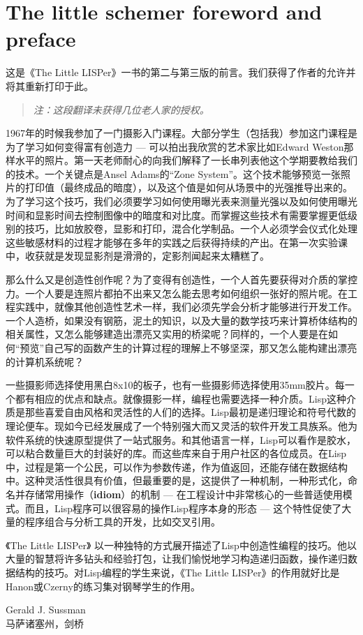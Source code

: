 \section*{The little schemer\cite{friedman96little} foreword and preface}

这是《The Little LISPer》一书的第二与第三版的前言。我们获得了作者的允许并将其重新打印于此。

\begin{quote}
\itshape
注：这段翻译未获得几位老人家的授权。
\end{quote}

1967年的时候我参加了一门摄影入门课程。大部分学生（包括我）参加这门课程是为了学习如何变得富有创造力 --- 可以拍出我欣赏的艺术家比如Edward Weston那样水平的照片。第一天老师耐心的向我们解释了一长串列表他这个学期要教给我们的技术。一个关键点是Ansel Adams的``Zone System''。这个技术能够预览一张照片的打印值（最终成品的暗度），以及这个值是如何从场景中的光强推导出来的。为了学习这个技巧，我们必须要学习如何使用曝光表来测量光强以及如何使用曝光时间和显影时间去控制图像中的暗度和对比度。而掌握这些技术有需要掌握更低级别的技巧，比如放胶卷，显影和打印，混合化学制品。一个人必须学会仪式化处理这些敏感材料的过程才能够在多年的实践之后获得持续的产出。在第一次实验课中，收获就是发现显影剂是滑滑的，定影剂闻起来太糟糕了。

那么什么又是创造性创作呢？为了变得有创造性，一个人首先要获得对介质的掌控力。一个人要是连照片都拍不出来又怎么能去思考如何组织一张好的照片呢。在工程实践中，就像其他创造性艺术一样，我们必须先学会分析才能够进行开发工作。一个人造桥，如果没有钢筋，泥土的知识，以及大量的数学技巧来计算桥体结构的相关属性，又怎么能够建造出漂亮又实用的桥梁呢？同样的，一个人要是在如何``预览''自己写的函数产生的计算过程的理解上不够坚深，那又怎么能构建出漂亮的计算机系统呢？

一些摄影师选择使用黑白8x10的板子，也有一些摄影师选择使用35mm胶片。每一个都有相应的优点和缺点。就像摄影一样，编程也需要选择一种介质。Lisp这种介质是那些喜爱自由风格和灵活性的人们的选择。Lisp最初是递归理论和符号代数的理论便车。现如今已经发展成了一个特别强大而又灵活的软件开发工具族系。他为软件系统的快速原型提供了一站式服务。和其他语言一样，Lisp可以看作是胶水，可以粘合数量巨大的封装好的库。而这些库来自于用户社区的各位成员。在Lisp中，过程是第一个公民，可以作为参数传递，作为值返回，还能存储在数据结构中。这种灵活性很具有价值，但最重要的是，这提供了一种机制，一种形式化，命名并存储常用操作（\textbf{idiom}）的机制 --- 在工程设计中非常核心的一些普适使用模式。而且，Lisp程序可以很容易的操作Lisp程序本身的形态 --- 这个特性促使了大量的程序组合与分析工具的开发，比如交叉引用。

《The Little LISPer》 以一种独特的方式展开描述了Lisp中创造性编程的技巧。他以大量的智慧将许多钻头和经验打包，让我们愉悦地学习构造递归函数，操作递归数据结构的技巧。对Lisp编程的学生来说，《The Little LISPer》的作用就好比是Hanon或Czerny的练习集对钢琴学生的作用。

{
\vspace{30pt}
\begin{flushright}
Gerald J. Sussman\\
马萨诸塞州，剑桥
\end{flushright}
}
